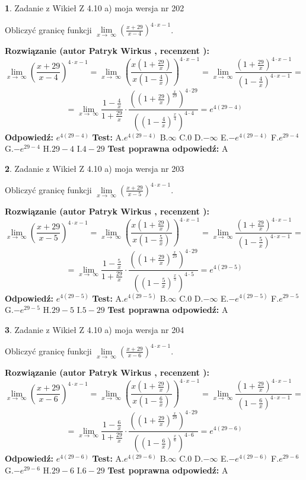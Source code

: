 \documentclass[12pt, a4paper]{article}
\theoremstyle{definition} %
\newtheorem{zad}{}
\newcommand{\zadStart}[1]{\begin{zad}#1\newline}
\newcommand{\zadStop}{\end{zad}}
\newcommand{\rozwStart}[2]{\noindent \textbf{Rozwiązanie (autor #1 , recenzent #2): }\newline}
\newcommand{\rozwStop}{\newline}
\newcommand{\odpStart}{\noindent \textbf{Odpowiedź:}\newline}
\newcommand{\odpStop}{\newline}
\newcommand{\testStart}{\noindent \textbf{Test:}\newline}
\newcommand{\testStop}{\newline}
\newcommand{\kluczStart}{\noindent \textbf{Test poprawna odpowiedź:}\newline}
\newcommand{\kluczStop}{\newline}
\begin{document}
\zadStart{Zadanie z Wikieł Z 4.10 a) moja wersja nr 202}


Obliczyć granicę funkcji  $\lim\limits_{x\to\ \infty}(\frac{x+29}{x-4})^{4\cdot x-1}$.
\zadStop
\rozwStart{Patryk Wirkus}{}
$$\lim\limits_{x\to\ \infty}(\frac{x+29}{x-4})^{4\cdot x-1} = \lim\limits_{x\to\ \infty}(\frac{x(1+\frac{29}{x})}{x(1-\frac{4}{x})})^{4\cdot x-1}=\lim\limits_{x\to\ \infty}\frac{(1+\frac{29}{x})^{4\cdot x-1}}{(1-\frac{4}{x})^{4\cdot x-1}}=$$
$$=\lim\limits_{x\to\ \infty}\frac{1-\frac{4}{x}}{1+\frac{29}{x}}\cdot\frac{((1+\frac{29}{x})^{\frac{x}{29}})^{4\cdot29}}{((1-\frac{4}{x})^{\frac{x}{4}})^{4\cdot4}}=e^{4(29-4)}$$
\rozwStop
\odpStart
$e^{4(29-4)}$
\odpStop
\testStart
A.$e^{4(29-4)}$ B.$\infty$ C.$0$ D.$-\infty$ E.$-e^{4(29-4)}$
F.$e^{29-4}$ G.$-e^{29-4}$
H.$29-4$
I.$4-29$
\testStop
\kluczStart
A
\kluczStop



\zadStart{Zadanie z Wikieł Z 4.10 a) moja wersja nr 203}


Obliczyć granicę funkcji  $\lim\limits_{x\to\ \infty}(\frac{x+29}{x-5})^{4\cdot x-1}$.
\zadStop
\rozwStart{Patryk Wirkus}{}
$$\lim\limits_{x\to\ \infty}(\frac{x+29}{x-5})^{4\cdot x-1} = \lim\limits_{x\to\ \infty}(\frac{x(1+\frac{29}{x})}{x(1-\frac{5}{x})})^{4\cdot x-1}=\lim\limits_{x\to\ \infty}\frac{(1+\frac{29}{x})^{4\cdot x-1}}{(1-\frac{5}{x})^{4\cdot x-1}}=$$
$$=\lim\limits_{x\to\ \infty}\frac{1-\frac{5}{x}}{1+\frac{29}{x}}\cdot\frac{((1+\frac{29}{x})^{\frac{x}{29}})^{4\cdot29}}{((1-\frac{5}{x})^{\frac{x}{5}})^{4\cdot5}}=e^{4(29-5)}$$
\rozwStop
\odpStart
$e^{4(29-5)}$
\odpStop
\testStart
A.$e^{4(29-5)}$ B.$\infty$ C.$0$ D.$-\infty$ E.$-e^{4(29-5)}$
F.$e^{29-5}$ G.$-e^{29-5}$
H.$29-5$
I.$5-29$
\testStop
\kluczStart
A
\kluczStop



\zadStart{Zadanie z Wikieł Z 4.10 a) moja wersja nr 204}


Obliczyć granicę funkcji  $\lim\limits_{x\to\ \infty}(\frac{x+29}{x-6})^{4\cdot x-1}$.
\zadStop
\rozwStart{Patryk Wirkus}{}
$$\lim\limits_{x\to\ \infty}(\frac{x+29}{x-6})^{4\cdot x-1} = \lim\limits_{x\to\ \infty}(\frac{x(1+\frac{29}{x})}{x(1-\frac{6}{x})})^{4\cdot x-1}=\lim\limits_{x\to\ \infty}\frac{(1+\frac{29}{x})^{4\cdot x-1}}{(1-\frac{6}{x})^{4\cdot x-1}}=$$
$$=\lim\limits_{x\to\ \infty}\frac{1-\frac{6}{x}}{1+\frac{29}{x}}\cdot\frac{((1+\frac{29}{x})^{\frac{x}{29}})^{4\cdot29}}{((1-\frac{6}{x})^{\frac{x}{6}})^{4\cdot6}}=e^{4(29-6)}$$
\rozwStop
\odpStart
$e^{4(29-6)}$
\odpStop
\testStart
A.$e^{4(29-6)}$ B.$\infty$ C.$0$ D.$-\infty$ E.$-e^{4(29-6)}$
F.$e^{29-6}$ G.$-e^{29-6}$
H.$29-6$
I.$6-29$
\testStop
\kluczStart
A
\kluczStop
\end{document}
